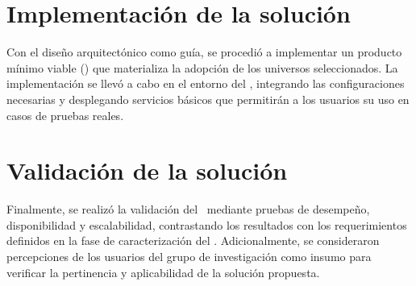 \section{Implementación de la solución}
\noindent
Con el diseño arquitectónico como guía, se procedió a implementar un producto mínimo viable (\PMV) que materializa la adopción de los universos seleccionados. La implementación se llevó a cabo en el entorno del \GRID, integrando las configuraciones necesarias y desplegando servicios básicos que permitirán a los usuarios su uso en casos de pruebas reales. %

\section{Validación de la solución}
\noindent
Finalmente, se realizó la validación del \PMV\ mediante pruebas de desempeño, disponibilidad y escalabilidad, contrastando los resultados con los requerimientos definidos en la fase de caracterización del \GRID. Adicionalmente, se consideraron percepciones de los usuarios del grupo de investigación como insumo para verificar la pertinencia y aplicabilidad de la solución propuesta.
